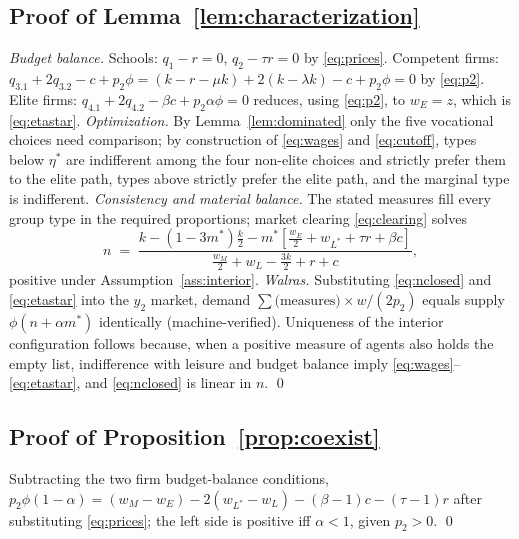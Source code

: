 \documentclass[12pt,letterpaper]{article}
\theoremstyle{definition}
\begin{document}
\subsection{Proof of Lemma~\ref{lem:characterization}}
\emph{Budget balance.}
Schools: $q_1-r=0$, $q_2-\tau r=0$ by \eqref{eq:prices}.
Competent firms: $q_{3.1}+2q_{3.2} - c + p_2\phi = (k-r-\mu k) + 2(k-\lambda k) - c + p_2\phi = 0$ by \eqref{eq:p2}.
Elite firms: $q_{4.1}+2q_{4.2} - \beta c + p_2\alpha\phi = 0$ reduces, using \eqref{eq:p2}, to $w_E = z$, which is \eqref{eq:etastar}.
\emph{Optimization.}
By Lemma~\ref{lem:dominated} only the five vocational choices need comparison; by construction of \eqref{eq:wages} and \eqref{eq:cutoff}, types below $\eta^\ast$ are indifferent among the four non-elite choices and strictly prefer them to the elite path, types above strictly prefer the elite path, and the marginal type is indifferent.
\emph{Consistency and material balance.}
The stated measures fill every group type in the required proportions; market clearing \eqref{eq:clearing} solves
\begin{equation}\label{eq:nclosed}
  n \;=\; \frac{k - (1-3m^\ast)\frac{k}{2} - m^\ast\left[\frac{w_E}{2} +
  w_{L^\ast} + \tau r + \beta c\right]}
  {\frac{w_M}{2} + w_L - \frac{3k}{2} + r + c},
\end{equation}
positive under Assumption~\ref{ass:interior}.
\emph{Walras.}
Substituting \eqref{eq:nclosed} and \eqref{eq:etastar} into the $y_2$ market, demand $\sum \text{(measures)}\times w/(2p_2)$ equals supply $\phi(n+\alpha m^\ast)$ identically (machine-verified).
Uniqueness of the interior configuration follows because, when a positive measure of agents also holds the empty list, indifference with leisure and budget balance imply \eqref{eq:wages}--\eqref{eq:etastar}, and \eqref{eq:nclosed} is linear in $n$.
\qed

\subsection{Proof of Proposition~\ref{prop:coexist}} Subtracting the two firm budget-balance conditions, $p_2\phi(1-\alpha) = (w_M - w_E) - 2(w_{L^\ast}-w_L) - (\beta-1)c - (\tau-1)r$ after substituting \eqref{eq:prices}; the left side is positive iff $\alpha<1$, given $p_2>0$.
\qed
\end{document}
